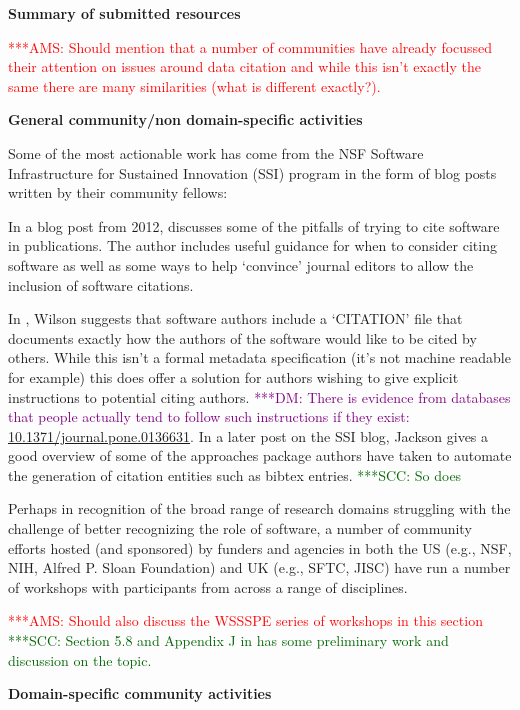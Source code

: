 \documentclass[11pt, oneside]{amsart}
\newcommand{\asnote}[1]{ {\textcolor{red} { ***AMS: #1 }}}
\newcommand{\scnote}[1]{ {\textcolor{darkgreen} { ***SCC: #1 }}} %
\newcommand{\dmnote}[1]{ {\textcolor{purple} { ***DM: #1 }}} %
\begin{document}
\textbf{Summary of submitted resources}

\asnote{Should mention that a number of communities have already focussed their attention on issues around data citation and while
this isn't exactly the same there are many similarities (what is different exactly?).}

\textbf{General community/non domain-specific activities}

Some of the most actionable work has come from the NSF Software Infrastructure for Sustained Innovation (SSI) program in the form of blog posts written by their community fellows:

In a blog post from 2012, \cite{ssi-how-to-cite} discusses some of the pitfalls of trying to cite software in publications.
The author includes useful guidance for when to consider citing software as well as some ways to help `convince' journal editors
to allow the inclusion of software citations.

In \cite{ssi-citation-files}, Wilson suggests that software authors include a `CITATION' file that documents exactly how the
authors of the software would like to be cited by others. While this isn't a formal metadata specification (it's not machine
readable for example) this does offer a solution for authors wishing to give explicit instructions to potential citing authors.\dmnote{There is evidence from databases that people actually tend to follow such instructions if they exist: \href{http://doi.org/10.1371/journal.pone.0136631}{10.1371/journal.pone.0136631}.}
In a later post on the SSI blog, Jackson \cite{ssi-how-shalt-i-cite-thee} gives a good overview of some of the approaches
package authors have taken to automate the generation of citation entities such as bibtex entries.
\scnote{So does \cite{knepley2013accurately}}

Perhaps in recognition of the broad range of research domains struggling with
the challenge of better recognizing the role of software, a number of community
efforts hosted (and sponsored) by funders and agencies in both the US (e.g., NSF,
NIH, Alfred P. Sloan Foundation) and UK (e.g., SFTC, JISC) have run a number of
workshops with participants from across a range of disciplines.

\asnote{Should also discuss the WSSSPE \cite{wssspe} series of workshops in this section}
\scnote{Section 5.8 and Appendix J in \cite{WSSSPE3} has some preliminary work and discussion on the topic.}

\textbf{Domain-specific community activities}
\end{document}
